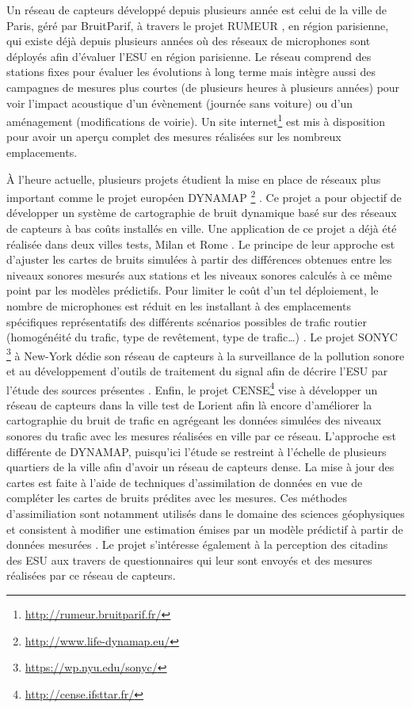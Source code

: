 
Un réseau de capteurs développé depuis plusieurs année est celui de la ville de Paris, géré par BruitParif, à travers le projet RUMEUR \cite{mietlicki2012innovative}, en région parisienne, qui existe déjà depuis plusieurs années où des réseaux de microphones sont déployés afin d'évaluer l'ESU en région parisienne. Le réseau comprend des stations fixes pour évaluer les évolutions à long terme mais intègre aussi des campagnes de mesures plus courtes (de plusieurs heures à plusieurs années) pour voir l'impact acoustique d'un évènement (journée sans voiture) ou d'un aménagement (modifications de voirie). Un site internet\footnote{\url{http://rumeur.bruitparif.fr/}} est mis à disposition pour avoir un aperçu complet des mesures réalisées sur les nombreux emplacements.

\`A l'heure actuelle, plusieurs projets étudient la mise en place de réseaux plus important comme le projet européen DYNAMAP \footnote{\url{http://www.life-dynamap.eu/}} \cite{dynamap_2016}. Ce projet a pour objectif de développer un système de cartographie de bruit dynamique basé sur des réseaux de capteurs à bas coûts installés en ville. Une application de ce projet a déjà été réalisée dans deux villes tests, Milan et Rome \cite{bellucci_life_2017}.
Le principe de leur approche est d'ajuster les cartes de bruits simulées à partir des différences obtenues entre les niveaux sonores mesurés aux stations et les niveaux sonores calculés à ce même point par les modèles prédictifs. Pour limiter le coût d'un tel déploiement, le nombre de microphones est réduit en les installant à des emplacements spécifiques représentatifs des différents scénarios possibles de trafic routier (homogénéité du trafic, type de revêtement, type de trafic\dots) \cite{zambon2017life}.
Le projet SONYC \footnote{\url{https://wp.nyu.edu/sonyc/}} à New-York dédie son réseau de capteurs à la surveillance de la pollution sonore et au développement d'outils de traitement du signal afin de décrire l'ESU par l'étude des sources présentes \cite{mydlarz2017noise}. 
Enfin, le projet CENSE\footnote{\url{http://cense.ifsttar.fr/}} vise à développer un réseau de capteurs dans la ville test de Lorient afin là encore d'améliorer la cartographie du bruit de trafic en agrégeant les données simulées des niveaux sonores du trafic avec les mesures réalisées en ville par ce réseau. L'approche est différente de DYNAMAP, puisqu'ici l'étude se restreint à l'échelle de plusieurs quartiers de la ville afin d'avoir un réseau de capteurs dense. La mise à jour des cartes est faite à l'aide de techniques d'assimilation de données en vue de compléter les cartes de bruits prédites avec les mesures.
Ces méthodes d'assimiliation sont notamment utilisés dans le domaine des sciences géophysiques et consistent à modifier une estimation émises par un modèle prédictif à partir de données mesurées \cite{wu2008comparison}.
Le projet s'intéresse également à la perception des citadins des ESU aux travers de questionnaires qui leur sont envoyés et des mesures réalisées par ce réseau de capteurs.

